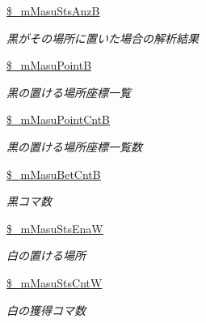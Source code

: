 \begin{DoxyCompactItemize}
\hyperlink{class_reversi_ade4534b9cb287ab570e5cbd9c6b8099c}{\$\+\_\+m\+Masu\+Sts\+AnzB}
\begin{DoxyCompactList}\small\item\em 黒がその場所に置いた場合の解析結果 \end{DoxyCompactList}\item 
\mbox{\label{class_reversi_a015fefbe17d9d4f13946cecb89493e37}} 
\hyperlink{class_reversi_a015fefbe17d9d4f13946cecb89493e37}{\$\+\_\+m\+Masu\+PointB}
\begin{DoxyCompactList}\small\item\em 黒の置ける場所座標一覧 \end{DoxyCompactList}\item 
\mbox{\label{class_reversi_af8936304d7c1ccb26eb7343172e11987}} 
\hyperlink{class_reversi_af8936304d7c1ccb26eb7343172e11987}{\$\+\_\+m\+Masu\+Point\+CntB}
\begin{DoxyCompactList}\small\item\em 黒の置ける場所座標一覧数 \end{DoxyCompactList}\item 
\mbox{\label{class_reversi_abf0e4db44b6b0ae1ecec4827e2394cdd}} 
\hyperlink{class_reversi_abf0e4db44b6b0ae1ecec4827e2394cdd}{\$\+\_\+m\+Masu\+Bet\+CntB}
\begin{DoxyCompactList}\small\item\em 黒コマ数 \end{DoxyCompactList}\item 
\mbox{\label{class_reversi_a1cf814c44538183769e091e84e4c810b}} 
\hyperlink{class_reversi_a1cf814c44538183769e091e84e4c810b}{\$\+\_\+m\+Masu\+Sts\+EnaW}
\begin{DoxyCompactList}\small\item\em 白の置ける場所 \end{DoxyCompactList}\item 
\mbox{\label{class_reversi_a14d7803befeac5ddaf9bedbac66e0812}} 
\hyperlink{class_reversi_a14d7803befeac5ddaf9bedbac66e0812}{\$\+\_\+m\+Masu\+Sts\+CntW}
\begin{DoxyCompactList}\small\item\em 白の獲得コマ数 \end{DoxyCompactList}\item 

\end{DoxyCompactItemize}
